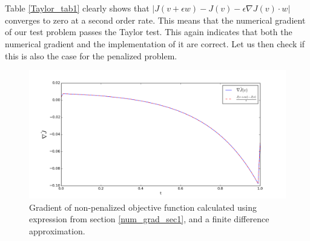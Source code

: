 \\
\\
Table \ref{Taylor_tab1} clearly shows that $|J(v+\epsilon w)-J(v)-\epsilon \nabla J(v)\cdot w|$ converges to zero at a second order rate. This means that the numerical gradient of our test problem passes the Taylor test. This again indicates that both the numerical gradient and the implementation of it are correct. Let us then check if this is also the case for the penalized problem.
\begin{figure}[h]
\centering
\includegraphics[scale=0.5]{num_grad.png}
\caption{Gradient of non-penalized objective function calculated using expression from section \ref{num_grad_sec1}, and a finite difference approximation.}
\end{figure}
